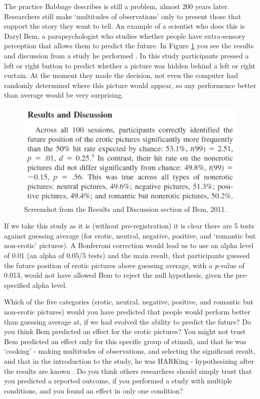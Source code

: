 \documentclass[
  oneside]{book}
\begin{document}
The practice Babbage describes is still a problem, almost 200 years later. Researchers still make `multitudes of observations' only to present those that support the story they want to tell. An example of a scientist who does this is Daryl Bem, a parapsychologist who studies whether people have extra-sensory perception that allows them to predict the future. In Figure \ref{fig:bem} you see the results and discussion from a study he performed \citep{bem_feeling_2011}. In this study participants pressed a left or right button to predict whether a picture was hidden behind a left or right curtain. At the moment they made the decision, not even the computer had randomly determined where this picture would appear, so any performence better than average would be very surprising.



\begin{figure}

{\centering \includegraphics[width=1\linewidth]{images/bem} 

}

\caption{Screenshot from the Results and Discussion section of Bem, 2011.}\label{fig:bem}
\end{figure}

If we take this study as it is (without pre-registration) it is clear there are 5 tests against guessing average (for erotic, neutral, negative, positive, and `romantic but non-erotic' pictures). A Bonferroni correction would lead us to use an alpha level of 0.01 (an alpha of 0.05/5 tests) and the main result, that participants guessed the future position of erotic pictures above guessing average, with a \emph{p}-value of 0.013, would not have allowed Bem to reject the null hypothesis, given the pre-specified alpha level.

Which of the five categories (erotic, neutral, negative, positive, and romantic but non-erotic pictures) would you have predicted that people would perform better than guessing average at, if we had evolved the ability to predict the future? Do you think Bem predicted an effect for the erotic pictures? You might not trust Bem predicted an effect only for this specific group of stimuli, and that he was `cooking' - making multitudes of observations, and selecting the significant result, and that in the introduction to the study, he was HARKing - hypothesizing after the results are known \citep{kerr_harking_1998}. Do you think others researchers should simply trust that you predicted a reported outcome, if you performed a study with multiple conditions, and you found an effect in only one condition?
\end{document}
